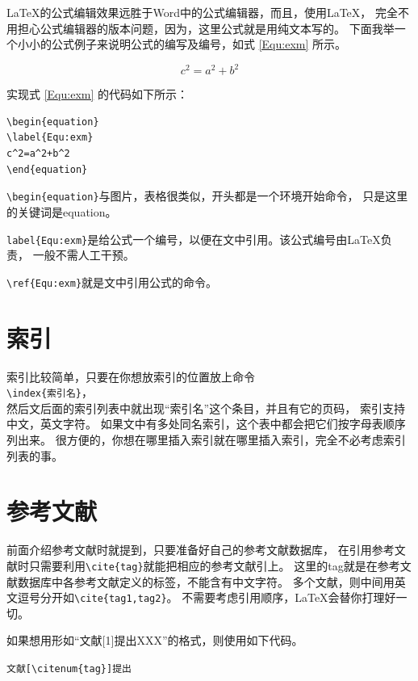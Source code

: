 \LaTeX 的公式编辑效果远胜于Word中的公式编辑器，而且，使用LaTeX，
完全不用担心公式编辑器的版本问题，因为，这里公式就是用纯文本写的。
下面我举一个小小的公式例子来说明公式的编写及编号，如式 \ref{Equ:exm} 所示。

\begin{equation}
\label{Equ:exm}
c^2=a^2+b^2
\end{equation}

实现式 \ref{Equ:exm} 的代码如下所示：

{
\linespread{1}
\noindent
\begin{verbatim}
\begin{equation}
\label{Equ:exm}
c^2=a^2+b^2
\end{equation}
\end{verbatim}
}

\verb+\begin{equation}+与图片，表格很类似，开头都是一个环境开始命令，
只是这里的关键词是equation。

\verb+label{Equ:exm}+是给公式一个编号，以便在文中引用。该公式编号由\LaTeX 负责，
一般不需人工干预。

\verb+\ref{Equ:exm}+就是文中引用公式的命令。

\section{索引}

索引比较简单，只要在你想放索引的位置放上命令\\
\verb+\index{索引名}+，\\
然后文后面的索引列表中就出现“索引名”这个条目，并且有它的页码，
索引支持中文，英文字符。
如果文中有多处同名索引，这个表中都会把它们按字母表顺序列出来。
很方便的，你想在哪里插入索引就在哪里插入索引，完全不必考虑索引列表的事。

\section{参考文献}

前面介绍参考文献时就提到，只要准备好自己的参考文献数据库，
在引用参考文献时只需要利用\verb+\cite{tag}+就能把相应的参考文献引上。
这里的tag就是在参考文献数据库中各参考文献定义的标签，不能含有中文字符。
多个文献，则中间用英文逗号分开如\verb+\cite{tag1,tag2}+。
不需要考虑引用顺序，\LaTeX 会替你打理好一切。

如果想用形如“文献[1]提出XXX”的格式，则使用如下代码。

{\noindent{}\verb+文献[\citenum{tag}]提出+}

